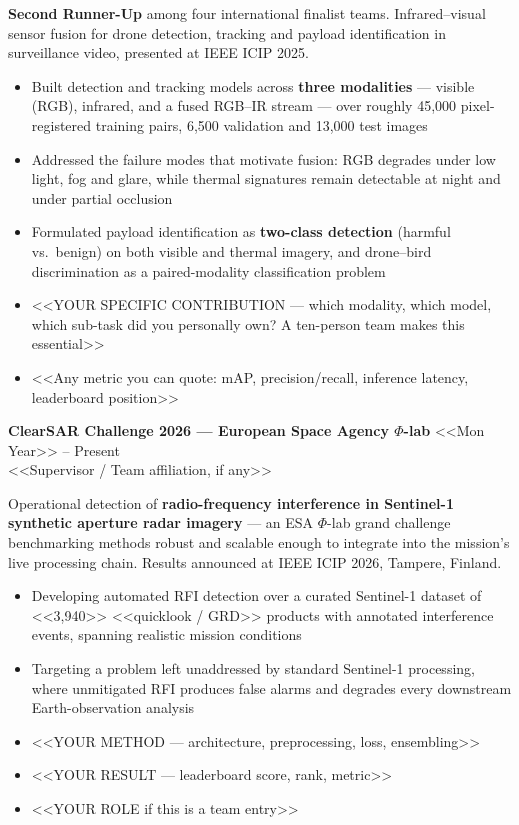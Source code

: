 \textbf{Second Runner-Up} among four international finalist teams. Infrared--visual sensor fusion
for drone detection, tracking and payload identification in surveillance video, presented at
IEEE ICIP 2025.

\begin{itemize}
  \item Built detection and tracking models across \textbf{three modalities} --- visible (RGB), infrared, and a fused RGB--IR stream --- over roughly 45,000 pixel-registered training pairs, 6,500 validation and 13,000 test images
  \item Addressed the failure modes that motivate fusion: RGB degrades under low light, fog and glare, while thermal signatures remain detectable at night and under partial occlusion
  \item Formulated payload identification as \textbf{two-class detection} (harmful vs.\ benign) on both visible and thermal imagery, and drone--bird discrimination as a paired-modality classification problem
  \item <<YOUR SPECIFIC CONTRIBUTION --- which modality, which model, which sub-task did you personally own? A ten-person team makes this essential>>
  \item <<Any metric you can quote: mAP, precision/recall, inference latency, leaderboard position>>
\end{itemize}

\vspace{6pt}

\textbf{ClearSAR Challenge 2026 --- European Space Agency $\Phi$-lab} \hfill <<Mon Year>> -- Present\\
<<Supervisor / Team affiliation, if any>>

Operational detection of \textbf{radio-frequency interference in Sentinel-1 synthetic aperture
radar imagery} --- an ESA $\Phi$-lab grand challenge benchmarking methods robust and scalable
enough to integrate into the mission's live processing chain. Results announced at IEEE ICIP 2026,
Tampere, Finland.

\begin{itemize}
  \item Developing automated RFI detection over a curated Sentinel-1 dataset of <<3,940>> <<quicklook / GRD>> products with annotated interference events, spanning realistic mission conditions
  \item Targeting a problem left unaddressed by standard Sentinel-1 processing, where unmitigated RFI produces false alarms and degrades every downstream Earth-observation analysis
  \item <<YOUR METHOD --- architecture, preprocessing, loss, ensembling>>
  \item <<YOUR RESULT --- leaderboard score, rank, metric>>
  \item <<YOUR ROLE if this is a team entry>>
\end{itemize}

